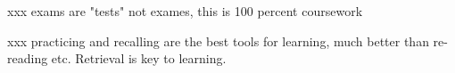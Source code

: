 \documentclass{../wobook2017}
\begin{document}
{xxx exams are "tests" not exames, this is 100 percent coursework

xxx practicing and recalling are the best tools for learning, much
better than re-reading etc. Retrieval is key to learning.

} %












\end{document}
